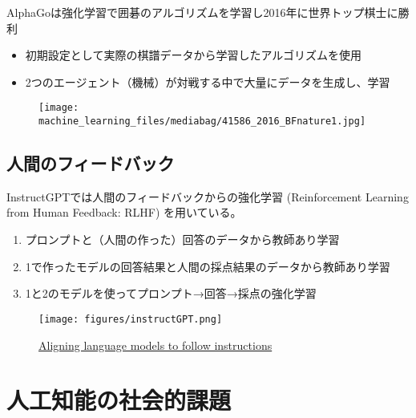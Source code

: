 \documentclass[
  xelatex,
  ja=standard]{bxjsarticle}
\providecommand{\tightlist}{%
  \setlength{\itemsep}{0pt}\setlength{\parskip}{0pt}}\usepackage{longtable,booktabs,array}
\begin{document}
AlphaGoは強化学習で囲碁のアルゴリズムを学習し2016年に世界トップ棋士に勝利

\begin{itemize}
\tightlist
\item
  初期設定として実際の棋譜データから学習したアルゴリズムを使用
\item
  2つのエージェント（機械）が対戦する中で大量にデータを生成し、学習
\end{itemize}

\begin{figure}[htpb]

{\centering \texttt{[image: machine\_learning\_files/mediabag/41586\_2016\_BFnature1.jpg]}

}

\caption{\citet{silver2016}}

\end{figure}

\hypertarget{ux4ebaux9593ux306eux30d5ux30a3ux30fcux30c9ux30d0ux30c3ux30af}{%
\subsection{人間のフィードバック}\label{ux4ebaux9593ux306eux30d5ux30a3ux30fcux30c9ux30d0ux30c3ux30af}}

InstructGPTでは人間のフィードバックからの強化学習 (Reinforcement
Learning from Human Feedback: RLHF) を用いている。

\begin{enumerate}
\def\labelenumi{\arabic{enumi}.}
\tightlist
\item
  プロンプトと（人間の作った）回答のデータから教師あり学習
\item
  1で作ったモデルの回答結果と人間の採点結果のデータから教師あり学習
\item
  1と2のモデルを使ってプロンプト→回答→採点の強化学習
\end{enumerate}

\begin{figure}[htpb]

{\centering \texttt{[image: figures/instructGPT.png]}

}

\caption{\href{https://openai.com/research/instruction-following}{Aligning
language models to follow instructions}}

\end{figure}

\hypertarget{ux4ebaux5de5ux77e5ux80fdux306eux793eux4f1aux7684ux8ab2ux984c}{%
\section{人工知能の社会的課題}\label{ux4ebaux5de5ux77e5ux80fdux306eux793eux4f1aux7684ux8ab2ux984c}}
\end{document}
